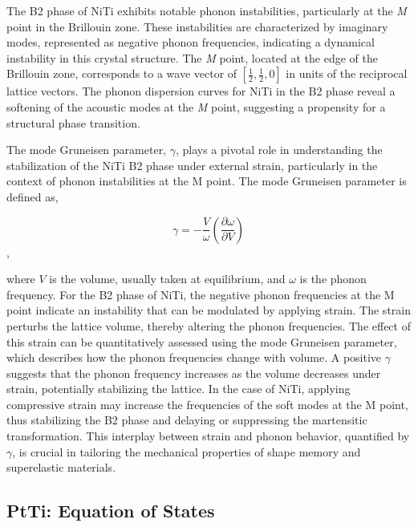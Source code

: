 \documentclass[preprint]{elsarticle}
\begin{document}
The B2 phase of NiTi exhibits notable phonon instabilities, particularly at the \textit{M} point in the Brillouin zone. These instabilities are characterized by imaginary modes, represented as negative phonon frequencies, indicating a dynamical instability in this crystal structure. The \textit{M} point, located at the edge of the Brillouin zone, corresponds to a wave vector of $\left[\frac{1}{2}, \frac{1}{2}, 0\right]$ in units of the reciprocal lattice vectors. The phonon dispersion curves for NiTi in the B2 phase reveal a softening of the acoustic modes at the \textit{M} point, suggesting a propensity for a structural phase transition. \par

The mode Gruneisen parameter, $\gamma$, plays a pivotal role in understanding the stabilization of the NiTi B2 phase under external strain, particularly in the context of phonon instabilities at the M point. The mode Gruneisen parameter is defined as,

\begin{equation}
  \label{eq:modegruneisen}
  \gamma = -\frac{V}{\omega}\left(\frac{\partial \omega}{\partial V}\right)
\end{equation},

where $V$ is the volume, usually taken at equilibrium, and $\omega$ is the phonon frequency. For the B2 phase of NiTi, the negative phonon frequencies at the M point indicate an instability that can be modulated by applying strain. The strain perturbs the lattice volume, thereby altering the phonon frequencies. The effect of this strain can be quantitatively assessed using the mode Gruneisen parameter, which describes how the phonon frequencies change with volume. A positive $\gamma$ suggests that the phonon frequency increases as the volume decreases under strain, potentially stabilizing the lattice. In the case of NiTi, applying compressive strain may increase the frequencies of the soft modes at the M point, thus stabilizing the B2 phase and delaying or suppressing the martensitic transformation. This interplay between strain and phonon behavior, quantified by $\gamma$, is crucial in tailoring the mechanical properties of shape memory and superelastic materials.





\subsection{PtTi: Equation of States}
\end{document}
